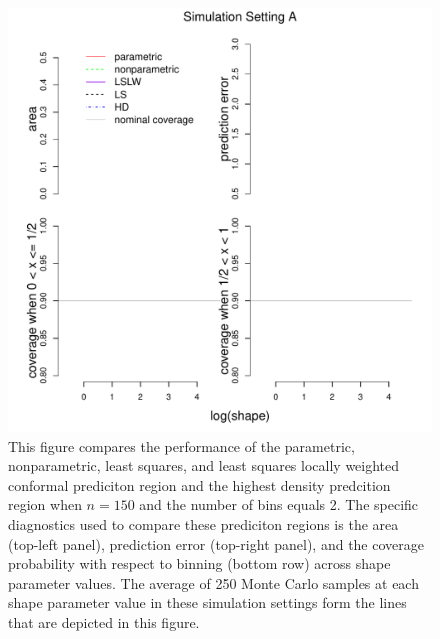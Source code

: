 \documentclass[11pt]{article}\usepackage[]{graphicx}\usepackage[]{color}
\makeatletter
\def\maxwidth{ %
  \ifdim\Gin@nat@width>\linewidth
    \linewidth
  \else
    \Gin@nat@width
  \fi
}
\newenvironment{kframe}{%
 \def\at@end@of@kframe{}%
 \ifinner\ifhmode%
  \def\at@end@of@kframe{\end{minipage}}%
  \begin{minipage}{\columnwidth}%
 \fi\fi%
 \def\FrameCommand##1{\hskip\@totalleftmargin \hskip-\fboxsep
 \colorbox{shadecolor}{##1}\hskip-\fboxsep
     \hskip-\linewidth \hskip-\@totalleftmargin \hskip\columnwidth}%
 \MakeFramed {\advance\hsize-\width
   \@totalleftmargin\z@ \linewidth\hsize
   \@setminipage}}%
 {\par\unskip\endMakeFramed%
 \at@end@of@kframe}
\newenvironment{knitrout}{}{} %
\makeatother
\begin{document}
\begin{figure}[h!]
\begin{center}
\begin{knitrout}
\begin{kframe}
{\ttfamily\noindent\bfseries\color{errorcolor}{\#\# Error in xy.coords(x, y): object 'HD.local.gamma.150' not found}}

{\ttfamily\noindent\bfseries\color{errorcolor}{\#\# Error in xy.coords(x, y): object 'para.local.gamma.150' not found}}

{\ttfamily\noindent\bfseries\color{errorcolor}{\#\# Error in xy.coords(x, y): object 'nonpara.local.gamma.150' not found}}

{\ttfamily\noindent\bfseries\color{errorcolor}{\#\# Error in xy.coords(x, y): object 'LSLW.local.gamma.150' not found}}

{\ttfamily\noindent\bfseries\color{errorcolor}{\#\# Error in xy.coords(x, y): object 'LS.local.gamma.150' not found}}

{\ttfamily\noindent\bfseries\color{errorcolor}{\#\# Error in xy.coords(x, y): object 'HD.local.gamma.150' not found}}\end{kframe}
\includegraphics[width=\maxwidth]{figure/Fig-gamma-150-1} 

\end{knitrout}
\end{center}
\caption{This figure compares the performance of the 
  parametric,
  nonparametric,
  least squares, and 
  least squares locally weighted conformal prediciton region and the 
  highest density predcition region when $n = 150$ and the number of bins 
  equals 2.  
  The specific diagnostics used to compare these prediciton regions is the 
    area (top-left panel),
    prediction error (top-right panel), and
    the coverage probability with respect to binning (bottom row) 
    across shape parameter values.
  The average of 250 Monte Carlo samples at each shape parameter value in 
  these simulation settings form the lines that are depicted in this figure.}
\label{Fig:gamma.150}
\end{figure}
\end{document}

